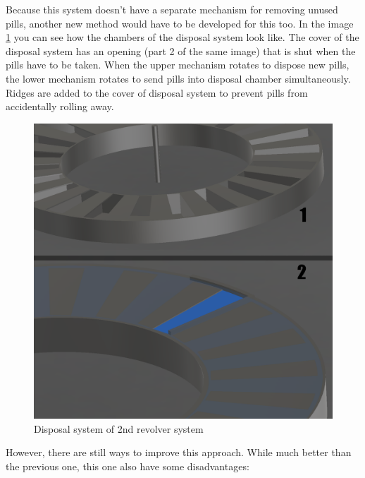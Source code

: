 Because this system doesn't have a separate mechanism for removing unused pills, another new method would have to be developed for this too. In the image \ref{fig:screenshot2} you can see how the chambers of the disposal system look like. The cover of the disposal system has an opening (part 2 of the same image) that is shut when the pills have to be taken. When the upper mechanism rotates to dispose new pills, the lower mechanism rotates to send pills into disposal chamber simultaneously. Ridges are added to the cover of disposal system to prevent pills from accidentally rolling away.

\begin{figure}
	\centering
	\includegraphics[width=0.7\linewidth]{Figures/PSPD2-Chambers}
	\caption[Disposal system of 2nd revolver system]{Disposal system of 2nd revolver system}
	\label{fig:screenshot2}
\end{figure}
\newpage
However, there are still ways to improve this approach. While much better than the previous one, this one also have some disadvantages:
